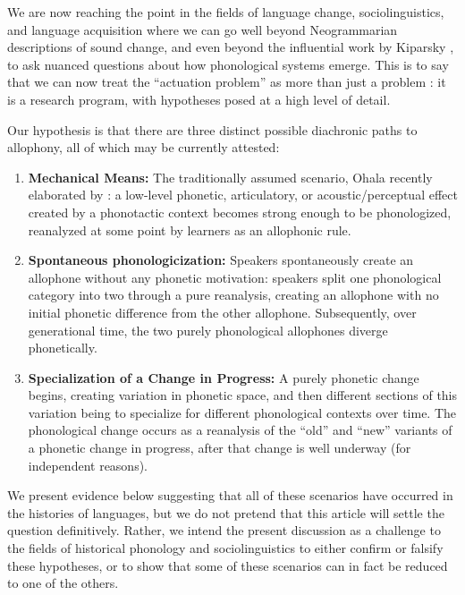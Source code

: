 We are now reaching the point in the fields of language change, sociolinguistics, and language acquisition where we can go well beyond Neogrammarian descriptions of sound change, and even beyond the influential work by Kiparsky , to ask nuanced questions about how phonological systems emerge. This is to say that we can now treat the ``actuation problem'' as more than just a problem \citep{wlh1968}: it is a research program, with hypotheses posed at a high level of detail.

Our hypothesis is that there are three distinct possible diachronic paths to allophony, all of which may be currently attested:
\begin{enumerate}
    \item \textbf{Mechanical Means:} The traditionally assumed scenario, Ohala  recently elaborated by \citet[][and previous work]{bermudezotero2014}: a low-level phonetic, articulatory, or acoustic/perceptual effect created by a phonotactic context becomes strong enough to be phonologized, reanalyzed at some point by learners as an allophonic rule. 
    \item \textbf{Spontaneous phonologicization:} Speakers spontaneously create an allophone without any phonetic motivation: speakers split one phonological category into two through a pure reanalysis, creating an allophone with no initial phonetic difference from the other allophone. Subsequently, over generational time, the two purely phonological allophones diverge phonetically.
    \item \textbf{Specialization of a Change in Progress:} A purely phonetic change begins, creating variation in phonetic space, and then different sections of this variation being to specialize for different phonological contexts over time. The phonological change occurs as a reanalysis of the ``old'' and ``new'' variants of a phonetic change in progress, after that change is well underway (for independent reasons). \\
\end{enumerate}
\noindent We present evidence below suggesting that all of these scenarios have occurred in the histories of languages, but we do not pretend that this article will settle the question definitively. Rather, we intend the present discussion as a challenge to the fields of historical phonology and sociolinguistics to either confirm or falsify these hypotheses, or to show that some of these scenarios can in fact be reduced to one of the others.

